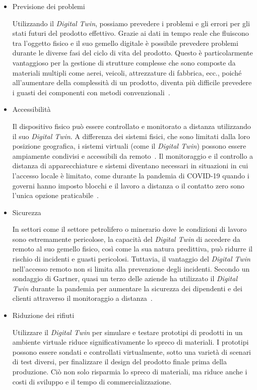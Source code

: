 \begin{itemize}
    \item Previsione dei problemi
    
    Utilizzando il \emph{Digital Twin}, possiamo prevedere i problemi e gli errori per gli stati futuri del prodotto effettivo. Grazie ai dati in tempo reale che fluiscono tra l'oggetto fisico e il suo gemello digitale è possibile prevedere problemi durante le diverse fasi del ciclo di vita del prodotto. Questo è particolarmente vantaggioso per la gestione di strutture complesse che sono composte da materiali multipli come aerei, veicoli, attrezzature di fabbrica, ecc., poiché all'aumentare della complessità di un prodotto, diventa più difficile prevedere i guasti dei componenti con metodi convenzionali~\cite{Testing_prototipo}.
    
    \item Accessibilità
    
    Il dispositivo fisico può essere controllato e monitorato a distanza utilizzando il suo \emph{Digital Twin}. A differenza dei sistemi fisici, che sono limitati dalla loro posizione geografica, i sistemi virtuali (come il \emph{Digital Twin}) possono essere ampiamente condivisi e accessibili da remoto~\cite{Economico}. Il monitoraggio e il controllo a distanza di apparecchiature e sistemi diventano necessari in situazioni in cui l'accesso locale è limitato, come durante la pandemia di COVID-19 quando i governi hanno imposto blocchi e il lavoro a distanza o il contatto zero sono l'unica opzione praticabile~\cite{Covid_DT}.
    
    \item Sicurezza
    
    In settori come il settore petrolifero o minerario dove le condizioni di lavoro sono estremamente pericolose, la capacità del \emph{Digital Twin} di accedere da remoto al suo gemello fisico, così come la sua natura predittiva, può ridurre il rischio di incidenti e guasti pericolosi. Tuttavia, il vantaggio del \emph{Digital Twin} nell'accesso remoto non si limita alla prevenzione degli incidenti. Secondo un sondaggio di Gartner, quasi un terzo delle aziende ha utilizzato il \emph{Digital Twin} durante la pandemia per aumentare la sicurezza dei dipendenti e dei clienti attraverso il monitoraggio a distanza~\cite{Gartner_covid}.
    
    \item  Riduzione dei rifiuti

    Utilizzare il \emph{Digital Twin} per simulare e testare prototipi di prodotti in un ambiente virtuale riduce significativamente lo spreco di materiali. I prototipi possono essere sondati e controllati virtualmente, sotto una varietà di scenari di test diversi, per finalizzare il design del prodotto finale prima della produzione. Ciò non solo risparmia lo spreco di materiali, ma riduce anche i costi di sviluppo e il tempo di commercializzazione.


\end{itemize}
